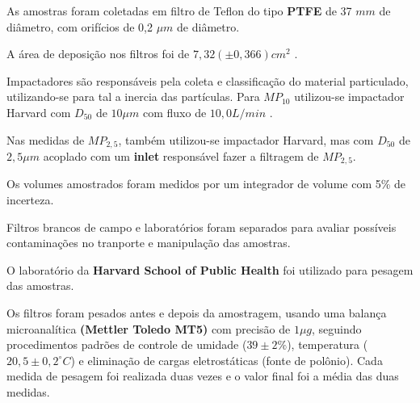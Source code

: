 As amostras  foram coletadas em filtro de Teflon do tipo 
\textbf{PTFE} de 37 $mm$ de diâmetro, com orifícios de 0,2 $\mu m$ de diâmetro. 

A área de deposição nos filtros foi de $7,32 (\pm 0,366) cm^2$ .

Impactadores são responsáveis pela coleta e classificação 
do material particulado, utilizando-se para tal a inercia das
partículas.
Para $MP_{10}$ utilizou-se impactador Harvard com $D_{50}$ de $10 \mu m$ 
com fluxo de $10,0 L/min$ \citep{marple1987}. 

Nas medidas de $MP_{2,5}$, também utilizou-se impactador Harvard, 
mas com $D_{50}$ de $2,5 \mu m$ acoplado com um \textbf{inlet} 
responsável fazer a filtragem de $MP_{2,5}$.

Os volumes amostrados foram medidos por um integrador de volume
com 5\% de incerteza.

Filtros brancos de campo e laboratórios foram separados para avaliar 
possíveis contaminações no tranporte e manipulação das amostras. 

O laboratório da \textbf{Harvard School of Public Health} foi
utilizado para pesagem das amostras.

Os filtros foram pesados antes e depois da amostragem, usando uma balança 
microanalítica \textbf{(Mettler Toledo MT5)} com precisão de $1 \mu g$, 
seguindo procedimentos padrões de controle de umidade ($39 \pm 2 \%$), 
temperatura ($20,5 \pm 0,2 ^{\circ} C$) e eliminação de cargas eletrostáticas 
(fonte de polônio). 
Cada medida de pesagem foi realizada duas vezes e o valor final foi a média das 
duas medidas. 
